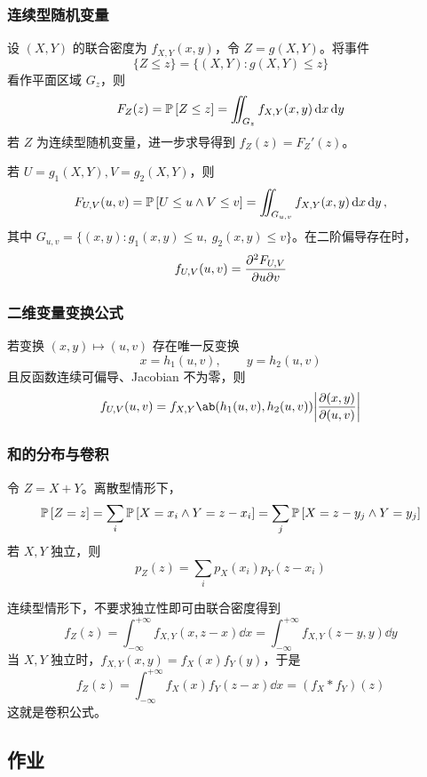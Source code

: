 \subsubsection{连续型随机变量}

设 $(X, Y)$ 的联合密度为 $f_{X,Y}(x, y)$，令 $Z = g(X, Y)$。将事件
$$
\{Z \le z\} = \{(X, Y): g(X, Y) \le z\}
$$
看作平面区域 $G_z$，则
$$
F_Z(z) = \operatorname{\mathbb{P}}\left[Z \le z\right] = \iint_{G_z} f_{X,Y}(x, y) \dd{x} \dd{y}
$$
若 $Z$ 为连续型随机变量，进一步求导得到 $f_Z(z) = F_Z'(z)$。

若 $U = g_1(X, Y), V = g_2(X, Y)$，则
$$
F_{U,V}(u, v) = \operatorname{\mathbb{P}}\left[U \le u \land V \le v\right] = \iint_{G_{u,v}} f_{X,Y}(x, y) \dd{x} \dd{y},
$$
其中 $G_{u,v} = \{(x, y): g_1(x, y) \le u,\ g_2(x, y) \le v\}$。在二阶偏导存在时，
$$
f_{U,V}(u, v) = \pdv[2]{F_{U,V}}{u}{v}
$$

\subsubsection{二维变量变换公式}

若变换 $(x, y) \mapsto (u, v)$ 存在唯一反变换
$$
x = h_1(u, v),\qquad y = h_2(u, v)
$$
且反函数连续可偏导、Jacobian 不为零，则
$$
f_{U,V}(u, v) = f_{X,Y}\ab(h_1(u, v), h_2(u, v)) \abs{\frac{\partial(x, y)}{\partial(u, v)}}
$$

\subsubsection{和的分布与卷积}

令 $Z = X + Y$。离散型情形下，
$$
\operatorname{\mathbb{P}}\left[Z = z\right] = \sum_i \operatorname{\mathbb{P}}\left[X = x_i \land Y = z - x_i\right] = \sum_j \operatorname{\mathbb{P}}\left[X = z - y_j \land Y = y_j\right]
$$
若 $X, Y$ 独立，则
$$
p_Z(z) = \sum_i p_X(x_i) p_Y(z - x_i)
$$

连续型情形下，不要求独立性即可由联合密度得到
$$
f_Z(z) = \int_{- \infty}^{+ \infty} f_{X,Y}(x, z - x) \dd{x} = \int_{- \infty}^{+ \infty} f_{X,Y}(z - y, y) \dd{y}
$$
当 $X, Y$ 独立时，$f_{X,Y}(x, y) = f_X(x) f_Y(y)$，于是
$$
f_Z(z) = \int_{- \infty}^{+ \infty} f_X(x) f_Y(z - x) \dd{x} = (f_X * f_Y)(z)
$$
这就是卷积公式。

\subsection{作业}

